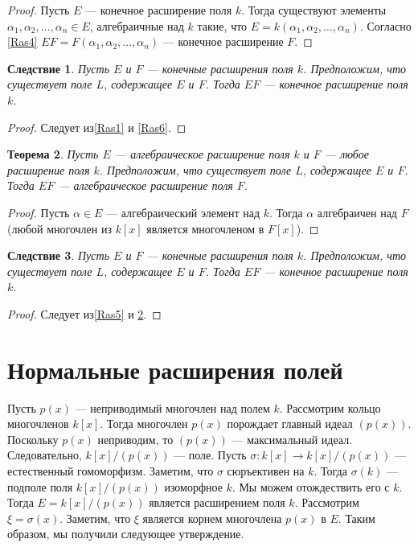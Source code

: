 \documentclass[12pt, titlepage, oneside]{amsbook}
\newtheorem{theorem}{Теорема}[chapter]
\newtheorem{corollary}[theorem]{Следствие}
\theoremstyle{definition}
\theoremstyle{remark}
\begin{document}
\begin{proof}
Пусть $E$ --- конечное расширение поля $k$. Тогда существуют элементы $\alpha_1,\alpha_2,\ldots,\alpha_n\in E$, алгебраичные над $k$ такие, что $E=k(\alpha_1,\alpha_2,\ldots,\alpha_n)$. Согласно \ref{Ras4} $EF=F(\alpha_1,\alpha_2,\ldots,\alpha_n)$ --- конечное расширение $F$.
\end{proof}

\begin{corollary}
\label{Ras7}
Пусть $E$ и $F$ --- конечные расширения поля $k$. Предположим, что существует поле $L$, содержащее $E$ и $F$. Тогда $EF$ --- конечное расширение поля $k$.
\end{corollary}

\begin{proof}
Следует из\ref{Ras1} и \ref{Ras6}.
\end{proof}

\begin{theorem}
\label{Ras8}
Пусть $E$ --- алгебраическое расширение поля $k$ и $F$ --- любое расширение поля $k$. Предположим, что существует поле $L$, содержащее $E$ и $F$. Тогда $EF$ --- алгебраическое расширение поля $F$.
\end{theorem}

\begin{proof}
Пусть $\alpha\in E$ --- алгебраический элемент над $k$. Тогда $\alpha$ алгебраичен над $F$ (любой многочлен из $k[x]$ является многочленом в $F[x]$).
\end{proof}

\begin{corollary}
\label{Ras9}
Пусть $E$ и $F$ --- конечные расширения поля $k$. Предположим, что существует поле $L$, содержащее $E$ и $F$. Тогда $EF$ --- конечное расширение поля $k$.
\end{corollary}

\begin{proof}
Следует из\ref{Ras5} и \ref{Ras8}.
\end{proof}

\section{Нормальные расширения полей}

Пусть $p(x)$ --- неприводимый многочлен над полем $k$. Рассмотрим кольцо многочленов $k[x]$. Тогда многочлен $p(x)$ порождает главный идеал $(p(x))$. Поскольку $p(x)$ неприводим, то $(p(x))$ --- максимальный идеал. Следовательно, $k[x]/(p(x))$ --- поле. Пусть $\sigma\colon k[x]\rightarrow k[x]/(p(x))$ --- естественный гомоморфизм. Заметим, что $\sigma$ сюръективен на $k$. Тогда $\sigma(k)$ --- подполе поля $k[x]/(p(x))$ изоморфное $k$. Мы можем отождествить его с $k$. Тогда $E=k[x]/(p(x))$ является расширением поля $k$. Рассмотрим $\xi=\sigma(x)$. Заметим, что $\xi$ является корнем многочлена  $p(x)$ в $E$. Таким образом, мы получили следующее утверждение.
\end{document}

